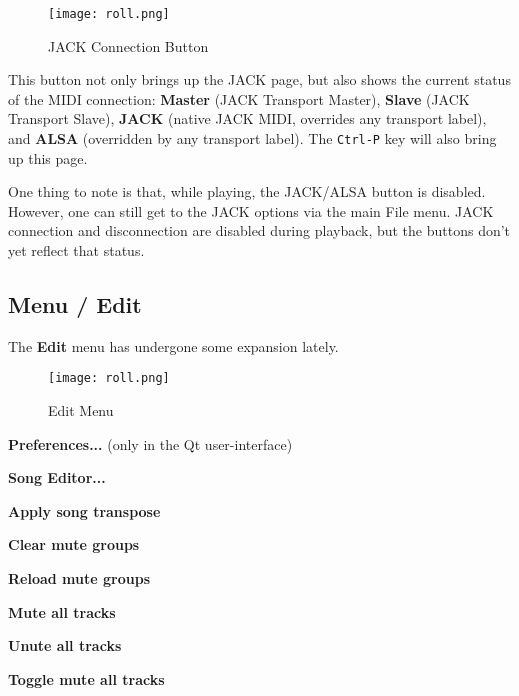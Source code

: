 \begin{figure}[H]
   \centering 
   \texttt{[image: roll.png]}
   \caption{JACK Connection Button}
   \label{fig:seq66_main_master_button}
\end{figure}

   This button not only brings up the JACK page, but also shows the current
   status of the MIDI connection:
   \textbf{Master} (JACK Transport Master),
   \textbf{Slave} (JACK Transport Slave),
   \textbf{JACK} (native JACK MIDI, overrides any transport label),
   and \textbf{ALSA} (overridden by any transport label).
   The \texttt{Ctrl-P} key will also bring up this page.

   One thing to note is that, while playing, the JACK/ALSA button is disabled.
   However, one can still get to the JACK options via the main File menu.
   JACK connection and disconnection are disabled during playback, but the
   buttons don't yet reflect that status.

\subsection{Menu / Edit}
\label{subsec:seq66_menu_edit}

   The \textbf{Edit} menu has undergone some expansion lately.

\begin{figure}[H]
   \centering 
   \texttt{[image: roll.png]}
   \caption{Edit Menu}
   \label{fig:seq66_menu_edit_0_90}
\end{figure}

   \begin{enumber}
      \item \textbf{Preferences...} (only in the Qt user-interface)
      \item \textbf{Song Editor...}
      \item \textbf{Apply song transpose}
      \item \textbf{Clear mute groups}
      \item \textbf{Reload mute groups}
      \item \textbf{Mute all tracks}
      \item \textbf{Unute all tracks}
      \item \textbf{Toggle mute all tracks}
   \end{enumber}


